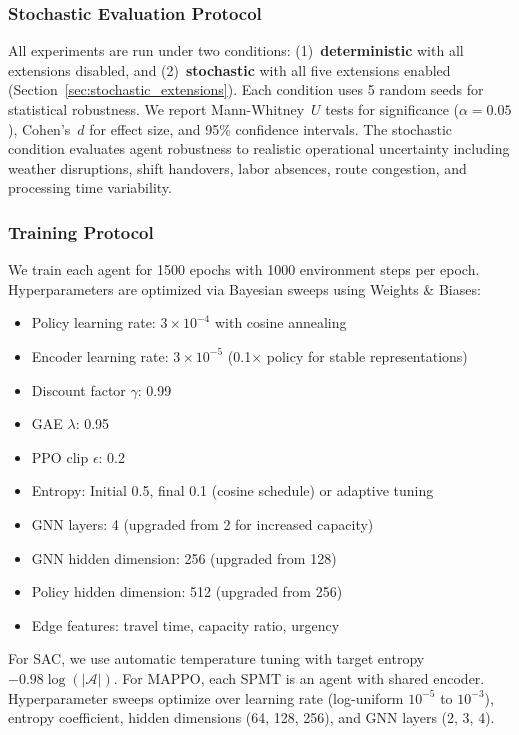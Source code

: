 \documentclass[11pt,a4paper]{article}
\begin{document}
\subsubsection{Stochastic Evaluation Protocol}

All experiments are run under two conditions: (1)~\textbf{deterministic} with all extensions disabled, and (2)~\textbf{stochastic} with all five extensions enabled (Section~\ref{sec:stochastic_extensions}). Each condition uses 5 random seeds for statistical robustness. We report Mann-Whitney~$U$ tests for significance ($\alpha = 0.05$), Cohen's~$d$ for effect size, and 95\% confidence intervals. The stochastic condition evaluates agent robustness to realistic operational uncertainty including weather disruptions, shift handovers, labor absences, route congestion, and processing time variability.

\subsubsection{Training Protocol}

We train each agent for 1500 epochs with 1000 environment steps per epoch. Hyperparameters are optimized via Bayesian sweeps using Weights \& Biases:
\begin{itemize}
    \item Policy learning rate: $3 \times 10^{-4}$ with cosine annealing
    \item Encoder learning rate: $3 \times 10^{-5}$ (0.1$\times$ policy for stable representations)
    \item Discount factor $\gamma$: 0.99
    \item GAE $\lambda$: 0.95
    \item PPO clip $\epsilon$: 0.2
    \item Entropy: Initial 0.5, final 0.1 (cosine schedule) or adaptive tuning
    \item GNN layers: 4 (upgraded from 2 for increased capacity)
    \item GNN hidden dimension: 256 (upgraded from 128)
    \item Policy hidden dimension: 512 (upgraded from 256)
    \item Edge features: travel time, capacity ratio, urgency
\end{itemize}

\noindent For SAC, we use automatic temperature tuning with target entropy $-0.98 \log(|\mathcal{A}|)$. For MAPPO, each SPMT is an agent with shared encoder. Hyperparameter sweeps optimize over learning rate (log-uniform $10^{-5}$ to $10^{-3}$), entropy coefficient, hidden dimensions (64, 128, 256), and GNN layers (2, 3, 4).
\end{document}
